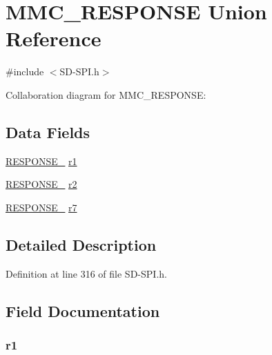\hypertarget{union_m_m_c___r_e_s_p_o_n_s_e}{}\section{M\+M\+C\+\_\+\+R\+E\+S\+P\+O\+N\+S\+E Union Reference}
\label{union_m_m_c___r_e_s_p_o_n_s_e}


{\ttfamily \#include $<$S\+D-\/\+S\+P\+I.\+h$>$}



Collaboration diagram for M\+M\+C\+\_\+\+R\+E\+S\+P\+O\+N\+S\+E\+:
\subsection*{Data Fields}
\begin{DoxyCompactItemize}
\item 
\hyperlink{union_r_e_s_p_o_n_s_e__1}{R\+E\+S\+P\+O\+N\+S\+E\+\_} \hyperlink{union_m_m_c___r_e_s_p_o_n_s_e_a800f942358541353f7696684f3526122}{r1}
\item 
\hyperlink{union_r_e_s_p_o_n_s_e__2}{R\+E\+S\+P\+O\+N\+S\+E\+\_} \hyperlink{union_m_m_c___r_e_s_p_o_n_s_e_aab48d3dd48cf0f86a44ef72c120d02a1}{r2}
\item 
\hyperlink{union_r_e_s_p_o_n_s_e__7}{R\+E\+S\+P\+O\+N\+S\+E\+\_} \hyperlink{union_m_m_c___r_e_s_p_o_n_s_e_a189db65c90218c9863a21cf9dcb74824}{r7}
\end{DoxyCompactItemize}


\subsection{Detailed Description}


Definition at line 316 of file S\+D-\/\+S\+P\+I.\+h.



\subsection{Field Documentation}
\hypertarget{union_m_m_c___r_e_s_p_o_n_s_e_a800f942358541353f7696684f3526122}{}
\subsubsection[{r1}]{ r1}\label{union_m_m_c___r_e_s_p_o_n_s_e_a800f942358541353f7696684f3526122}


